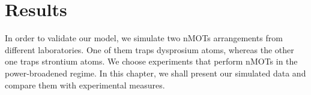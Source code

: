 %
\chapter{Results}
\label{ch:results}
% 

In order to validate our model, we simulate two nMOTs arrangements from different laboratories. One of them traps dysprosium atoms, whereas the other one traps strontium atoms. We choose experiments that perform nMOTs in the power-broadened regime. In this chapter, we shall present our simulated data and compare them with experimental measures.


%


%
